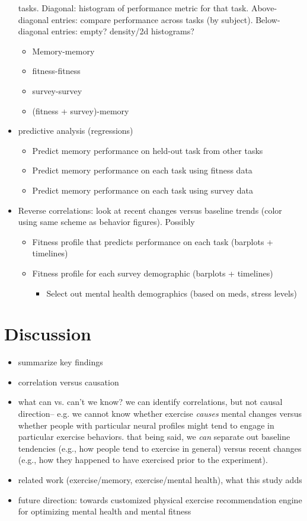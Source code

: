 \documentclass[10pt]{article}
\begin{document}
\begin{itemize}
          tasks.  Diagonal: histogram of performance metric for that
          task.  Above-diagonal entries: compare performance across
          tasks (by subject).  Below-diagonal entries: empty?
          density/2d histograms?
    \begin{itemize}
    \item Memory-memory
    \item fitness-fitness
    \item survey-survey
    \item (fitness + survey)-memory
    \end{itemize}
  \item predictive analysis (regressions)
    \begin{itemize}
    \item Predict memory performance on held-out task from other tasks
    \item Predict memory performance on each task using fitness data
      \item Predict memory performance on each task using survey data
      \end{itemize}
    \item Reverse correlations: look at recent changes versus baseline
      trends (color using same scheme as behavior figures).  Possibly 
      \begin{itemize}
      \item Fitness profile that predicts performance on each task (barplots + timelines)
      \item Fitness profile for each survey demographic (barplots + timelines)
        \begin{itemize}
          \item Select out mental health demographics (based on meds, stress levels)
          \end{itemize}
        \end{itemize}
  \end{itemize}

  \section*{Discussion}
  \begin{itemize}
  \item summarize key findings
  \item correlation versus causation
         \item what can vs. can't we know?  we can identify correlations, but not causal direction-- e.g. we cannot know whether exercise \textit{causes} mental changes versus whether people with particular neural profiles might tend to engage in particular exercise behaviors.  that being said, we \textit{can} separate out baseline tendencies (e.g., how people tend to exercise in general) versus recent changes (e.g., how they happened to have exercised prior to the experiment).
  \item related work (exercise/memory, exercise/mental health), what this study adds
    \item future direction: towards customized physical exercise recommendation engine for optimizing mental health and mental fitness
    \end{itemize}
\end{document}
